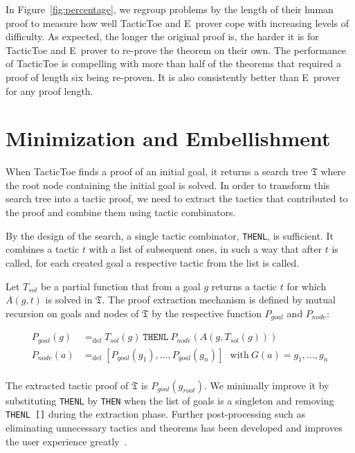 \documentclass[runningheads,a4paper,draft]{svjour3}
\def\eprover{\textsf{E~prover}\xspace}
\def\tactictoe{\textsf{TacticToe}\xspace}
\begin{document}
In Figure~\ref{fig:percentage}, we regroup problems by the length of their
human proof to measure how well \tactictoe and \eprover cope with increasing
levels
of difficulty. As expected, the longer the original proof is, the harder it is
for \tactictoe and \eprover to re-prove the theorem on their own.
The performance of \tactictoe is compelling with more than half of the theorems
that required a proof of length six being re-proven. It is also consistently
better than \eprover for any proof length.

\section{Minimization and Embellishment}\label{sec:proofdisplay}
When \tactictoe finds a proof of an initial goal, it returns a search tree
$\mathfrak{T}$ where the root node containing the initial goal is solved.
In order to transform this search tree into a tactic proof, we need to extract
the tactics that contributed to the proof and combine them using tactic
combinators.

By the design of the search, a single tactic combinator, \texttt{THENL}, is
sufficient. It combines a tactic $t$ with a list of subsequent ones, in such a
way that after $t$ is called, for each created goal a respective
tactic from the list is called.

Let $T_{sol}$ be a partial function that from a goal $g$ returns a tactic $t$
for which $A(g,t)$ is solved in $\mathfrak{T}$.
The proof extraction mechanism is defined by mutual
recursion on goals and nodes of $\mathfrak{T}$ by the respective function
$P_{goal}$ and $P_{node}$:

\begin{align*}
P_{goal}(g) &=_{\mathrm{def}} T_{sol}(g)\ \texttt{THENL}\ P_{node}(A(g,T_{sol}(g)))\\
P_{node}(a) &=_{\mathrm{def}} [P_{goal}(g_1),\ldots,P_{goal}(g_n)]\ \ \ \text{with}\
G(a) = g_1,\ldots,g_n\\
\end{align*}

The extracted tactic proof of $\mathfrak{T}$ is $P_{goal}(g_{root})$.
We minimally improve it by substituting \texttt{THENL} by \texttt{THEN} when the
list of goals is a singleton and removing \texttt{THENL []} during the
extraction phase.
Further post-processing such as
eliminating unnecessary tactics and theorems has been developed and
improves the user experience greatly~\cite{DBLP:conf/sefm/Adams15}.
\end{document}
